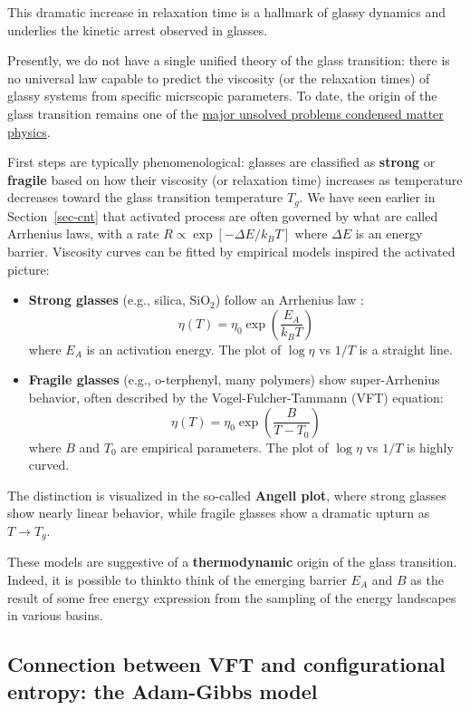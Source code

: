 \documentclass[
  letterpaper,
  enabledeprecatedfontcommands]{report}
\begin{document}
This dramatic increase in relaxation time is a hallmark of glassy
dynamics and underlies the kinetic arrest observed in glasses.

Presently, we do not have a single unified theory of the glass
transition: there is no universal law capable to predict the viscosity
(or the relaxation times) of glassy systems from specific micrscopic
parameters. To date, the origin of the glass transition remains one of
the
\href{https://en.wikipedia.org/wiki/List_of_unsolved_problems_in_physics\#Condensed_matter_physics}{major
unsolved problems condensed matter physics}.

First steps are typically phenomenological: glasses are classified as
\textbf{strong} or \textbf{fragile} based on how their viscosity (or
relaxation time) increases as temperature decreases toward the glass
transition temperature \(T_g\). We have seen earlier in
Section~\ref{sec-cnt} that activated process are often governed by what
are called Arrhenius laws, with a rate
\(R\propto \exp\left[-\Delta E/k_B T\right]\) where \(\Delta E\) is an
energy barrier. Viscosity curves can be fitted by empirical models
inspired the activated picture:

\begin{itemize}
\item
  \textbf{Strong glasses} (e.g., silica, SiO\(_2\)) follow an Arrhenius
  law : \[
    \eta(T) = \eta_0 \exp\left(\frac{E_A}{k_B T}\right)
    \] where \(E_A\) is an activation energy. The plot of \(\log \eta\)
  vs \(1/T\) is a straight line.
\item
  \textbf{Fragile glasses} (e.g., o-terphenyl, many polymers) show
  super-Arrhenius behavior, often described by the Vogel-Fulcher-Tammann
  (VFT) equation: \[
    \eta(T) = \eta_0 \exp\left(\frac{B}{T - T_0}\right)
    \] where \(B\) and \(T_0\) are empirical parameters. The plot of
  \(\log \eta\) vs \(1/T\) is highly curved.
\end{itemize}

The distinction is visualized in the so-called \textbf{Angell plot},
where strong glasses show nearly linear behavior, while fragile glasses
show a dramatic upturn as \(T \to T_g\).

These models are suggestive of a \textbf{thermodynamic} origin of the
glass transition. Indeed, it is possible to thinkto think of the
emerging barrier \(E_A\) and \(B\) as the result of some free energy
expression from the sampling of the energy landscapes in various basins.

\subsection{Connection between VFT and configurational entropy: the
Adam-Gibbs
model}\label{connection-between-vft-and-configurational-entropy-the-adam-gibbs-model}
\end{document}
